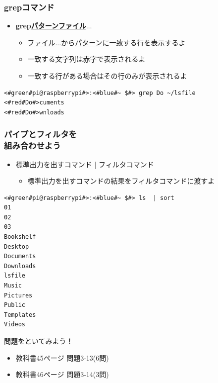 \documentclass[slide03.tex]{subfiles}
\begin{document}
\begin{frame}[fragile]
    \frametitle{grepコマンド}
    \begin{itemize}
        \item {\bf grep\textvisiblespace\underline{パターン}\textvisiblespace\underline{ファイル}$\ldots$}
        \begin{itemize}
            \small
            \item[] \underline{ファイル}$\ldots$から\underline{パターン}に一致する行を表示するよ
            \item[] 一致する文字列は赤字で表示されるよ
            \item[] 一致する行がある場合はその行のみが表示されるよ
        \end{itemize}
    \end{itemize}
    \begin{lstlisting}[title=grepコマンドの実行例, label=grep_example]
<#green#pi@raspberrypi#>:<#blue#~ $#> grep Do ~/lsfile
<#red#Do#>cuments
<#red#Do#>wnloads
    \end{lstlisting}
\end{frame}

\begin{frame}[fragile]
    \frametitle{パイプとフィルタを\\組み合わせよう}
    \vspace{1em}
    \begin{itemize}
        \item 標準出力を出すコマンド | フィルタコマンド
        \begin{itemize}
            \small
            \item[] 標準出力を出すコマンドの結果をフィルタコマンドに渡すよ
        \end{itemize}
    \end{itemize}
    \begin{lstlisting}[title=パイプラインを用いたsortコマンドの実行例, label=ppsort_example]
<#green#pi@raspberrypi#>:<#blue#~ $#> ls  | sort
01
02
03
Bookshelf
Desktop
Documents
Downloads
lsfile
Music
Pictures
Public
Templates
Videos
    \end{lstlisting}
\end{frame}

\begin{frame}
    \begin{exampleblock}{問題をといてみよう！}
        \begin{itemize}
            \item 教科書45ページ 問題3-13(6問)
            \item 教科書46ページ 問題3-14(3問)
        \end{itemize}
    \end{exampleblock}
\end{frame}
\end{document}
